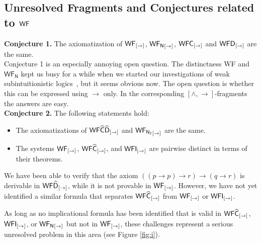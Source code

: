 \documentclass[12pt]{article}
\begin{document}
\subsection{Unresolved Fragments and Conjectures related to ${\sf WF } $}\label{unresolve}

\textbf{Conjecture 1.} The axiomatization of $ {\sf WF}_{[\rightarrow]} $, $ {\sf WF_{N}}_{[\rightarrow]}$, ${\sf WFC}_{[\rightarrow]}$ and ${\sf WFD}_{[\rightarrow]}$ are the same.\\


Conjecture 1 is an especially annoying open question. The distinctness {\sf WF} and $\mathsf{WF_N}$ kept us busy for a while when we started our investigations of weak subintuitionistic logics~\cite{FD}, but it seems obvious now. The open question is whether this can be expressed using $\rightarrow$ only. In the corresponding $[\wedge, \rightarrow]$-fragments the answers are easy.\\


\noindent\textbf{Conjecture 2.} The following statements hold:
\begin{itemize}
    \item[(a)] The axiomatizations of ${\sf WF}\widehat{{\sf C}}\widehat{{\sf D}}_{[\rightarrow]}$ and ${\sf WF_{N_{2}}}_{[\rightarrow]}$ are the same.
    \item[(b)] The systems ${\sf WF}_{[\rightarrow]}$, ${\sf WF}\widehat{{\sf C}}_{[\rightarrow]}$, and ${\sf WFI}_{[\rightarrow]}$ are pairwise distinct in terms of their theorems. 
\end{itemize}



\noindent
We have been able to verify that the axiom $((p \rightarrow p) \rightarrow r) \rightarrow (q \rightarrow r)$ is derivable in ${\sf WF}\widehat{{\sf D}}_{[\rightarrow]}$, while it is not provable in ${\sf WF}_{[\rightarrow]}$. However, we have not yet identified a similar formula that separates ${\sf WF}\widehat{{\sf C}}_{[\rightarrow]}$ from ${\sf WF}_{[\rightarrow]}$ or ${\sf WFI}_{[\rightarrow]}$.

\medskip

\noindent
As long as no implicational formula has been identified that is valid in  ${\sf WF}\widehat{\sf C} _{[\rightarrow]}$, ${\sf WFI}_{[\rightarrow]}$, or  ${\sf WF_{N}}_{[\rightarrow]}$ but not in ${\sf WF}_{[\rightarrow]}$, these challenges represent a serious unresolved problem in this area (see Figure \ref{fig:i}).
\end{document}
